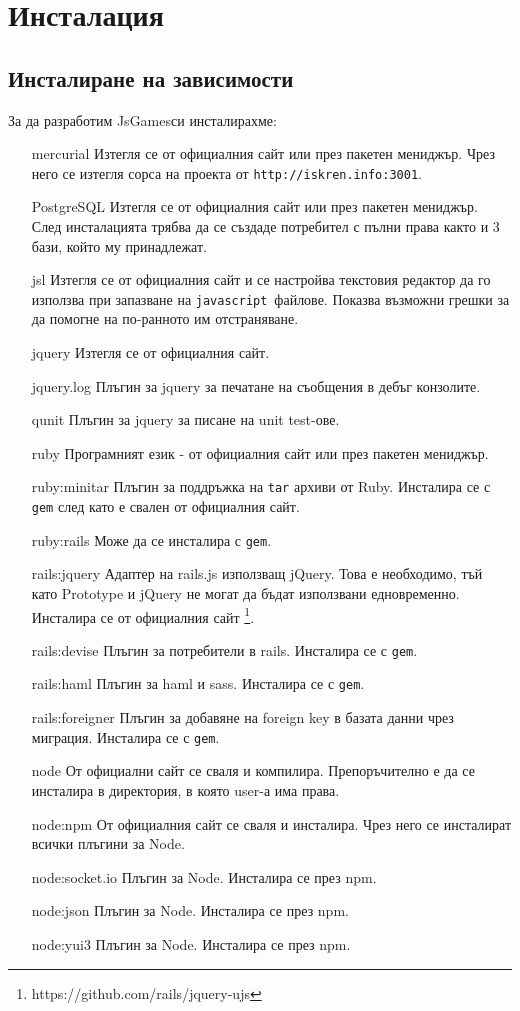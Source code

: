 \documentclass[a4paper]{article}
\def\js{\texttt{javascript}}
\def\jsg{JsGames}
\begin{document}
\section{Инсталация}

\subsection{Инсталиране на зависимости}

За да разработим \jsg си инсталирахме:
\begin{itemize}
  \item[mercurial] Изтегля се от официалния сайт или през пакетен мениджър. Чрез него се изтегля сорса на проекта от \texttt{http://iskren.info:3001}.
  \item[PostgreSQL] Изтегля се от официалния сайт или през пакетен мениджър. \\
    След инсталацията трябва да се създаде потребител с пълни права както и 3 бази, който му принадлежат.
  \item[jsl] Изтегля се от официалния сайт и се настройва текстовия редактор да го използва при запазване на \js\ файлове. Показва възможни грешки за да помогне на по-ранното им отстраняване.
  \item[jquery] Изтегля се от официалния сайт.
  \item[jquery.log] Плъгин за jquery за печатане на съобщения в дебъг конзолите.
  \item[qunit] Плъгин за jquery за писане на unit test-ове.
  \item[ruby] Програмният език - от официалния сайт или през пакетен мениджър.
  \item[ruby:minitar] Плъгин за поддръжка на \texttt{tar} архиви от Ruby. Инсталира се с \texttt{gem} след като е свален от официалния сайт.
  \item[ruby:rails] Може да се инсталира с \texttt{gem}.
  \item[rails:jquery] Адаптер на rails.js използващ jQuery. Това е необходимо, тъй като Prototype и jQuery не могат да бъдат използвани едновременно. Инсталира се от официалния сайт \footnote{https://github.com/rails/jquery-ujs}.
  \item[rails:devise] Плъгин за потребители в rails. Инсталира се с \texttt{gem}.
  \item[rails:haml] Плъгин за haml и sass. Инсталира се с \texttt{gem}.
  \item[rails:foreigner] Плъгин за добавяне на foreign key в базата данни чрез миграция. Инсталира се с \texttt{gem}.
  \item[node] От официални сайт се сваля и компилира. Препоръчително е да се инсталира в директория, в която user-а има права.
  \item[node:npm] От официалния сайт се сваля и инсталира. Чрез него се инсталират всички плъгини за Node.
  \item[node:socket.io] Плъгин за Node. Инсталира се през npm.
  \item[node:json] Плъгин за Node. Инсталира се през npm.
  \item[node:yui3] Плъгин за Node. Инсталира се през npm.
\end{itemize}
\end{document}
